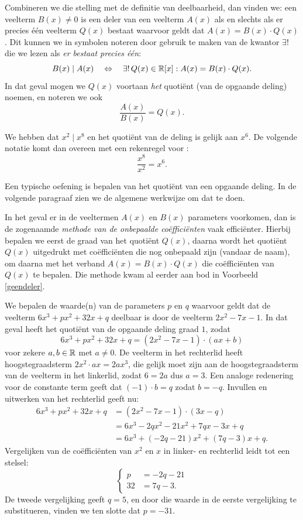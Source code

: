 \documentclass{ximera}
\begin{document}
Combineren we die stelling met de definitie van deelbaarheid, dan vinden we: een veelterm $B(x) \neq 0$ is een deler van een veelterm $A(x)$ als en slechts als er precies \'e\'en veelterm $Q(x)$ bestaat waarvoor geldt dat $A(x) = B(x)\cdot Q(x)$. Dit kunnen we in symbolen noteren door gebruik te maken van de kwantor $\exists!$ die we lezen als {\em er bestaat precies \'e\'en}:
\[
B(x) \mid A(x) \quad \Leftrightarrow \quad \exists! \, Q(x) \in \mathbb{R}[x]: A(x) = B(x)\cdot Q(x).
\] 
In dat geval mogen we $Q(x)$ voortaan {\em het} quoti\"ent (van de opgaande deling) noemen, en noteren we ook 
\[
\frac{A(x)}{B(x)} = Q(x).
\]

\begin{voorbeeld}
We hebben dat $x^2 \mid x^8$ en het quoti\"ent van de deling is gelijk aan $x^6$. De volgende notatie komt dan overeen met een rekenregel voor :
\[
\frac{x^8}{x^2} = x^6.
\]
\end{voorbeeld}

\clearpage

Een typische oefening is bepalen van het quoti\"ent van een opgaande deling. In de volgende paragraaf zien we de algemene werkwijze om dat te doen. 

In het geval er in de veeltermen $A(x)$ en $B(x)$ parameters voorkomen, dan is de zogenaamde {\em methode van de onbepaalde co\"effici\"enten} vaak effici\"enter. Hierbij bepalen we eerst de graad van het quoti\"ent $Q(x)$, daarna wordt het quoti\"ent $Q(x)$ uitgedrukt met co\"effici\"enten die nog onbepaald zijn (vandaar de naam), om daarna met het verband $A(x) = B(x) \cdot Q(x)$ die co\"effici\"enten van $Q(x)$ te bepalen. Die methode kwam al eerder aan bod in Voorbeeld \ref{geendeler}. 

\begin{voorbeeld}
We bepalen de waarde(n) van de parameters $p$ en $q$ waarvoor geldt dat de veelterm $6x^3+px^2+32x+q$ deelbaar is door de veelterm $2x^2-7x-1$. In dat geval heeft het quoti\"ent van de opgaande deling graad $1$, zodat 
\[
6x^3+px^2+32x+q = (2x^2-7x-1)\cdot (ax+b)
\]
voor zekere $a,b \in \mathbb{R}$ met $a \neq 0$. De veelterm in het rechterlid heeft hoogstegraadsterm $2x^2 \cdot ax = 2ax^3$, die gelijk moet zijn aan de hoogstegraadsterm van de veelterm in het linkerlid, zodat $6 = 2a$ dus $a = 3$. Een analoge redenering voor de constante term geeft dat $(-1) \cdot b = q$ zodat $b = -q$. Invullen en uitwerken van het rechterlid geeft nu:
\begin{align*}
6x^3+px^2+32x+q 
& = (2x^2-7x-1)\cdot (3x-q) \\
& = 6x^3 - 2qx^2 - 21x^2 + 7qx - 3x + q \\
& = 6x^3 + (-2q-21)x^2 + (7q-3)x+q.
\end{align*}
Vergelijken van de co\"effici\"enten van $x^2$ en $x$ in linker- en rechterlid leidt tot een stelsel:
\[
\left\{ 
\begin{aligned}
p & = -2q - 21 \\
32 & = 7q - 3. 
\end{aligned}
\right.
\]
De tweede vergelijking geeft $q = 5$, en door die waarde in de eerste vergelijking te substitueren, vinden we ten slotte dat $p = -31$.  
\end{voorbeeld}
\end{document}
